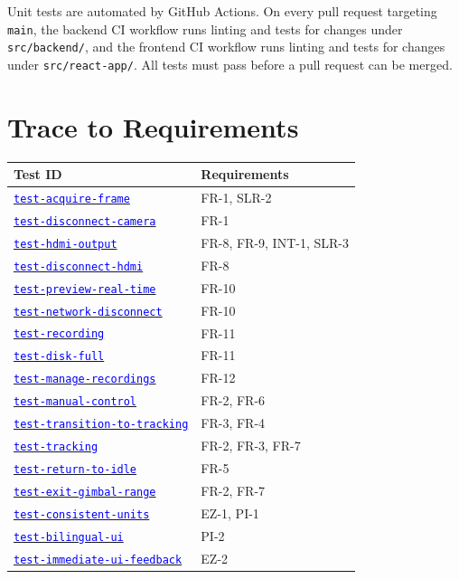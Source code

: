 \documentclass[12pt, titlepage]{article}
\newcommand{\tid}[1]{\hyperlink{tid:#1}{\textcolor{blue}{\texttt{#1}}}}
\begin{document}
Unit tests are automated by GitHub Actions. On every pull request targeting
\texttt{main}, the backend CI workflow runs linting and tests for changes under
\texttt{src/backend/}, and the frontend CI workflow runs linting and tests for
changes under \texttt{src/react-app/}. All tests must pass before a pull
request can be merged.

\section{Trace to Requirements}
\label{sec:trace_reqs}

\begin{tabularx}{\textwidth}{p{5cm}X}
  \toprule {\bf Test ID}             & {\bf Requirements}       \\
  \midrule
  \tid{test-acquire-frame}           & FR-1, SLR-2              \\
  \tid{test-disconnect-camera}       & FR-1                     \\
  \tid{test-hdmi-output}             & FR-8, FR-9, INT-1, SLR-3 \\
  \tid{test-disconnect-hdmi}         & FR-8                     \\
  \tid{test-preview-real-time}       & FR-10                    \\
  \tid{test-network-disconnect}      & FR-10                    \\
  \tid{test-recording}               & FR-11                    \\
  \tid{test-disk-full}               & FR-11                    \\
  \tid{test-manage-recordings}       & FR-12                    \\
  \tid{test-manual-control}          & FR-2, FR-6               \\
  \tid{test-transition-to-tracking}  & FR-3, FR-4               \\
  \tid{test-tracking}                & FR-2, FR-3, FR-7         \\
  \tid{test-return-to-idle}          & FR-5                     \\
  \tid{test-exit-gimbal-range}       & FR-2, FR-7               \\
  \tid{test-consistent-units}        & EZ-1, PI-1               \\
  \tid{test-bilingual-ui}            & PI-2                     \\
  \tid{test-immediate-ui-feedback}   & EZ-2                     \\

\end{tabularx}
\end{document}
